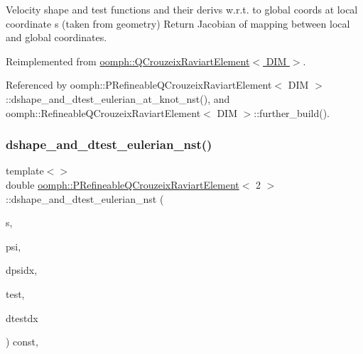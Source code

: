 Velocity shape and test functions and their derivs w.\+r.\+t. to global coords at local coordinate s (taken from geometry) Return Jacobian of mapping between local and global coordinates. 



Reimplemented from \hyperlink{classoomph_1_1QCrouzeixRaviartElement_af1553d79bb5f49fd21f695d468ea59d4}{oomph\+::\+Q\+Crouzeix\+Raviart\+Element$<$ D\+I\+M $>$}.



Referenced by oomph\+::\+P\+Refineable\+Q\+Crouzeix\+Raviart\+Element$<$ D\+I\+M $>$\+::dshape\+\_\+and\+\_\+dtest\+\_\+eulerian\+\_\+at\+\_\+knot\+\_\+nst(), and oomph\+::\+Refineable\+Q\+Crouzeix\+Raviart\+Element$<$ D\+I\+M $>$\+::further\+\_\+build().

\mbox{\label{classoomph_1_1PRefineableQCrouzeixRaviartElement_a8ded9a5c48d5112468313b1354ad5b44}} 
\subsubsection{\texorpdfstring{dshape\+\_\+and\+\_\+dtest\+\_\+eulerian\+\_\+nst()}{dshape\_and\_dtest\_eulerian\_nst()}\hspace{0.1cm}{\footnotesize\ttfamily [2/3]}}
{\footnotesize\ttfamily template$<$$>$ \\
double \hyperlink{classoomph_1_1PRefineableQCrouzeixRaviartElement}{oomph\+::\+P\+Refineable\+Q\+Crouzeix\+Raviart\+Element}$<$ 2 $>$\+::dshape\+\_\+and\+\_\+dtest\+\_\+eulerian\+\_\+nst (\begin{DoxyParamCaption}\item[{const \hyperlink{classoomph_1_1Vector}{Vector}$<$ double $>$ \&}]{s,  }\item[{\hyperlink{classoomph_1_1Shape}{Shape} \&}]{psi,  }\item[{\hyperlink{classoomph_1_1DShape}{D\+Shape} \&}]{dpsidx,  }\item[{\hyperlink{classoomph_1_1Shape}{Shape} \&}]{test,  }\item[{\hyperlink{classoomph_1_1DShape}{D\+Shape} \&}]{dtestdx }\end{DoxyParamCaption}) const\hspace{0.3cm}{\ttfamily [inline]}, {\ttfamily [virtual]}}

